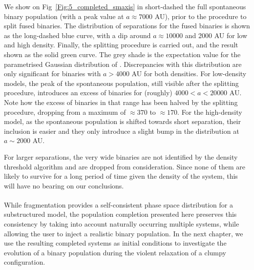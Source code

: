 We show on Fig~\ref{Fig:5_completed_smaxis} in short-dashed  the full spontaneous binary population (with a peak value at $a \approx 7 000$ AU), prior to the procedure to split fused binaries. The distribution of separations for the fused binaries is shown as the long-dashed blue curve, with a dip around $ a \approx 10 000$ and 2000 AU for low and high density. Finally, the splitting procedure is carried out, and the result shown as the solid green curve. The grey shade is the expectation value for
the parametrised Gaussian distribution of \cite{Raghavan2010}. Discrepancies with this distribution are only significant for binaries with $a > 4 000$ AU for both densities. For low-density models, the peak of the spontaneous population, still visible after the splitting procedure, introduces an excess of binaries for (roughly)  $ 4 000 < a < 20 000 $ AU. Note how the excess of binaries in that range has been halved by the splitting procedure, dropping from a maximum of $\approx 370$ to $ \approx 170$. For the high-density model, as the spontaneous population is shifted towards short separation, their inclusion is easier and they only introduce a slight bump in the distribution at $ a \sim 2 000 $ AU.

 For larger separations, the very wide binaries are not identified by the density threshold algorithm and are dropped from consideration. Since none of them are likely to survive for a long period of time given the density of the system, this will have no bearing on our conclusions. 

\paragraph*{}
While \HubLem fragmentation provides a self-consistent phase space distribution for a substructured model, the population completion presented here preserves this consistency by taking into account naturally occurring multiple systems, while allowing the user to inject a realistic binary population. In the next chapter, we use the resulting completed systems as initial conditions to investigate the evolution of a binary population during the violent relaxation of a clumpy configuration.



